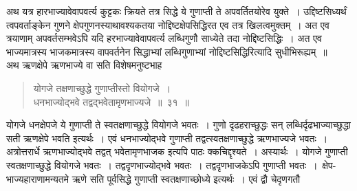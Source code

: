 \documentclass[11pt, openany]{book}
\begin{document}
 अथ यत्र हारभाज्यावेवापवर्त्य कुट्टकः क्रियते तत्र सिद्धे ये 
गुणाप्ती ते अपवर्तितयोरेव युक्ते~। उद्दिष्टसिध्यर्थं त्वपवर्ताङ्केन गुणने 
क्षेपगुणनस्याथावश्यकतया नोद्दिष्टक्षेपसिद्धिरत एव तत्र खिलत्वमुक्तम्~। अत 
एव त्रयाणाम् अपवर्तसम्भवेऽपि यदि हरभाज्यावेवापवर्त्य लब्धिगुणौ साध्येते तदा 
नोद्दिष्टसिद्धिः~। अत एव भाज्यमात्रस्य भाजकमात्रस्य वापवर्तनेन सिद्धाभ्यां 
लब्धिगुणाभ्यां नोद्दिष्टसिद्धिरित्यादि सुधीभिरूह्यम्~॥ \\

\vspace{-3mm}
 अथ ऋणक्षेपे ऋणभाज्ये वा सति विशेषमनुष्टभाह\textendash 
 
 \label{31}
\begin{quote}
    \bs
     योगजे तक्षणाच्छुद्धे गुणाप्तीस्तो वियोगजे~। \\
 धनभाज्योद्भवे तद्वद्भवेतामृणभाज्यजे~॥~३१~॥ 
\end{quote}

 योगजे धनक्षेपजे ये गुणाप्ती ते स्वतक्षणाच्छुद्धे वियोगजे भवतः~। 
गुणो दृढहराच्छुद्धः सन् लब्धिर्दृढभाज्याच्छुद्धा सती ऋणक्षेपे भवति 
इत्यर्थः~। एवं धनभाज्योद्भवे गुणाप्ती तद्वत्स्वतक्षणाच्छुद्धे ऋणभाज्यजे
भवतः~। अत्रोत्तरार्धे ऋणभाज्योद्भवे तद्वत् भवेतामृणभाजक इत्यपि पाठः क्कचिद्दृश्यते~। 
अस्यार्थः~। योगजे गुणाप्ती स्वतक्षणाच्छुद्धे वियोगजे भवतः~। तद्वदृणभाज्योद्भवे भवतः~। तद्वदृणभाजकेऽपि गुणाप्ती भवतः~।~क्षेप-भाज्यहाराणामन्यतमे 
ऋणे सति पूर्वसिद्धे गुणाप्ती स्वतक्षणाच्छोध्ये इत्यर्थः~। एवं द्वौ चेदृणगतौ

\newpage%
\end{document}
